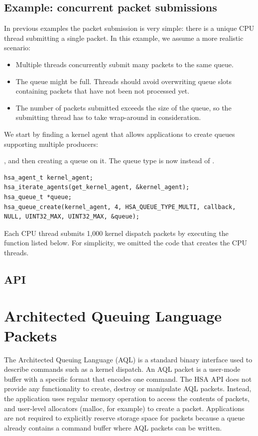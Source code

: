 \documentclass[oneside]{book}
\begin{document}
\subsection{Example: concurrent packet submissions}
In previous examples the packet submission is very simple: there is a unique CPU
thread submitting a single packet. In this example, we assume a more realistic
scenario:
\begin{itemize}[itemsep=1pt,topsep=3pt,partopsep=0pt]
\item Multiple threads concurrently submit many packets to the same queue.
\item The queue might be full. Threads should avoid overwriting queue slots
  containing packets that have not been not processed yet.
\item The number of packets submitted exceeds the size of the queue, so the
  submitting thread has to take wrap-around in consideration.
\end{itemize}

We start by finding a kernel agent that allows applications to create queues
supporting multiple producers:

, and then creating a queue on it. The queue type is now
 instead of .
\begin{lstlisting}
hsa_agent_t kernel_agent;
hsa_iterate_agents(get_kernel_agent, &kernel_agent);
hsa_queue_t *queue;
hsa_queue_create(kernel_agent, 4, HSA_QUEUE_TYPE_MULTI, callback, NULL, UINT32_MAX, UINT32_MAX, &queue);
\end{lstlisting}
Each CPU thread submits 1,000 kernel dispatch packets by executing the function
listed below. For simplicity, we omitted the code that creates the CPU threads.


\subsection{API}


\section{Architected Queuing Language Packets}\label{sec:aql} The Architected
Queuing Language (AQL) is a standard binary interface used to describe commands
such as a kernel dispatch. An AQL packet is a user-mode buffer with a specific
format that encodes one command. The HSA API does not provide any functionality
to create, destroy or manipulate AQL packets. Instead, the application uses
regular memory operation to access the contents of packets, and user-level
allocators (malloc, for example) to create a packet. Applications are not
required to explicitly reserve storage space for packets because a
queue already contains a command buffer where AQL packets can be written.
\end{document}
